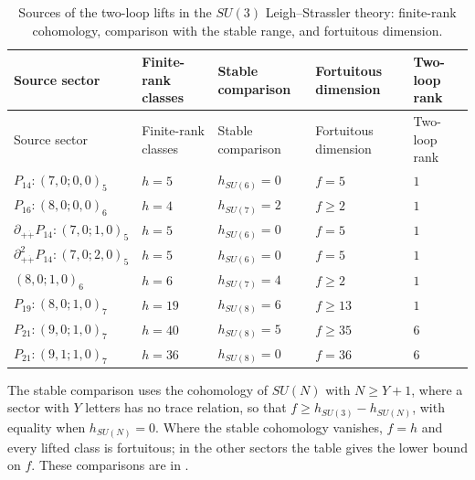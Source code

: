 \documentclass[11pt]{article}
\numberwithin{equation}{section}
\numberwithin{figure}{section}
\numberwithin{table}{section}
\begin{document}
{\footnotesize\renewcommand{\arraystretch}{1.3}\setlength{\tabcolsep}{3.5pt}
\begin{xltabular}{\linewidth}{|>{\raggedright\arraybackslash}X|l|l|l|l|}
\caption{Sources of the two-loop lifts in the $SU(3)$ Leigh--Strassler theory: finite-rank cohomology, comparison with the stable range, and fortuitous dimension.}\label{local-ch9-ls-fortuity}\\
\hline
Source sector & Finite-rank classes & Stable comparison & Fortuitous dimension & Two-loop rank\\
\hline\endfirsthead
\hline
Source sector & Finite-rank classes & Stable comparison & Fortuitous dimension & Two-loop rank\\
\hline\endhead
$P_{14}:(7,0;0,0)_5$ & $h=5$ & $h_{SU(6)}=0$ & $f=5$ & $1$\\
\hline
$P_{16}:(8,0;0,0)_6$ & $h=4$ & $h_{SU(7)}=2$ & $f\ge2$ & $1$\\
\hline
$\partial_{+\dot+}P_{14}:(7,0;1,0)_5$ & $h=5$ & $h_{SU(6)}=0$ & $f=5$ & $1$\\
\hline
$\partial_{+\dot+}^2P_{14}:(7,0;2,0)_5$ & $h=5$ & $h_{SU(6)}=0$ & $f=5$ & $1$\\
\hline
$(8,0;1,0)_6$ & $h=6$ & $h_{SU(7)}=4$ & $f\ge2$ & $1$\\
\hline
$P_{19}:(8,0;1,0)_7$ & $h=19$ & $h_{SU(8)}=6$ & $f\ge13$ & $1$\\
\hline
$P_{21}:(9,0;1,0)_7$ & $h=40$ & $h_{SU(8)}=5$ & $f\ge35$ & $6$\\
\hline
$P_{21}:(9,1;1,0)_7$ & $h=36$ & $h_{SU(8)}=0$ & $f=36$ & $6$\\
\hline
\end{xltabular}}

The stable comparison uses the cohomology of $SU(N)$ with $N\ge Y+1$, where a sector with $Y$ letters has no trace relation, so that $f\ge h_{SU(3)}-h_{SU(N)}$, with equality when $h_{SU(N)}=0$. Where the stable cohomology vanishes, $f=h$ and every lifted class is fortuitous; in the other sectors the table gives the lower bound on $f$. These comparisons are in \cite[supplement, Section S6.6]{Repo}.
\end{document}
